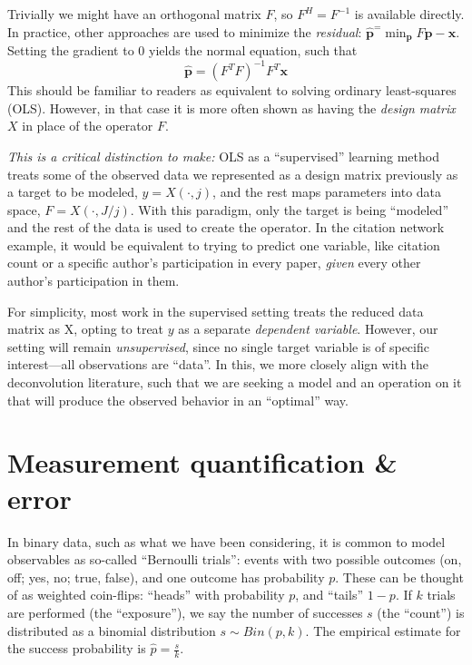 \documentclass[%
	12pt,
		oneside,
		letterpaper
]{book}
\begin{document}
Trivially we might have an orthogonal matrix \(F\), so \(F^H=F^{-1}\) is
available directly. In practice, other approaches are used to minimize
the \emph{residual}:
\(\hat{\mathbf{p}}^=\min_{\mathbf{p}} F\mathbf{p}-\mathbf{x}\). Setting
the gradient to 0 yields the normal equation, such that
\[ \hat{\mathbf{p}}=(F^TF)^{-1}F^T\mathbf{x}\] This should be familiar
to readers as equivalent to solving ordinary least-squares (OLS).
However, in that case it is more often shown as having the \emph{design
matrix} \(X\) in place of the operator \(F\).

\emph{This is a critical distinction to make:} OLS as a ``supervised''
learning method treats some of the observed data we represented as a
design matrix previously as a target to be modeled, \(y=X(\cdot,j)\),
and the rest maps parameters into data space, \(F=X(\cdot,J/j)\). With
this paradigm, only the target is being ``modeled'' and the rest of the
data is used to create the operator. In the citation network example, it
would be equivalent to trying to predict one variable, like citation
count or a specific author's participation in every paper, \emph{given}
every other author's participation in them.

For simplicity, most work in the supervised setting treats the reduced
data matrix as X, opting to treat \(y\) as a separate \emph{dependent
variable}. However, our setting will remain \emph{unsupervised}, since
no single target variable is of specific interest---all observations are
``data''. In this, we more closely align with the deconvolution
literature, such that we are seeking a model and an operation on it that
will produce the observed behavior in an ``optimal'' way.

\section{Measurement quantification \& error}\label{sec-smooth-err}

In binary data, such as what we have been considering, it is common to
model observables as so-called ``Bernoulli trials'': events with two
possible outcomes (on, off; yes, no; true, false), and one outcome has
probability \(p\). These can be thought of as weighted coin-flips:
``heads'' with probability \(p\), and ``tails'' \(1-p\). If \(k\) trials
are performed (the ``exposure''), we say the number of successes \(s\)
(the ``count'') is distributed as a binomial distribution
\(s\sim Bin(p,k)\). The empirical estimate for the success probability
is \(\hat{p}=\tfrac{s}{k}\).
\end{document}
